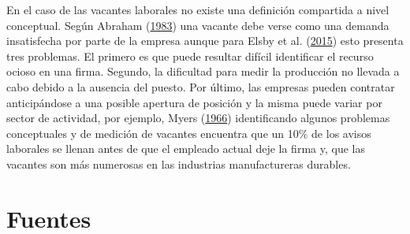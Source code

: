 \documentclass[12pt,oneside]{reedthesis}
\begin{document}
En el caso de las vacantes laborales no existe una definición compartida a nivel conceptual. Según Abraham (\protect\hyperlink{ref-Abraham1983}{1983}) una vacante debe verse como una demanda insatisfecha por parte de la empresa aunque para Elsby et al. (\protect\hyperlink{ref-Elsby2015}{2015}) esto presenta tres problemas. El primero es que puede resultar difícil identificar el recurso ocioso en una firma. Segundo, la dificultad para medir la producción no llevada a cabo debido a la ausencia del puesto. Por último, las empresas pueden contratar anticipándose a una posible apertura de posición y la misma puede variar por sector de actividad, por ejemplo, Myers (\protect\hyperlink{ref-Myers1966}{1966}) identificando algunos problemas conceptuales y de medición de vacantes encuentra que un 10\% de los avisos laborales se llenan antes de que el empleado actual deje la firma y, que las vacantes son más numerosas en las industrias manufactureras durables.

\hypertarget{fuentes}{%
\section{Fuentes}\label{fuentes}}
\end{document}
